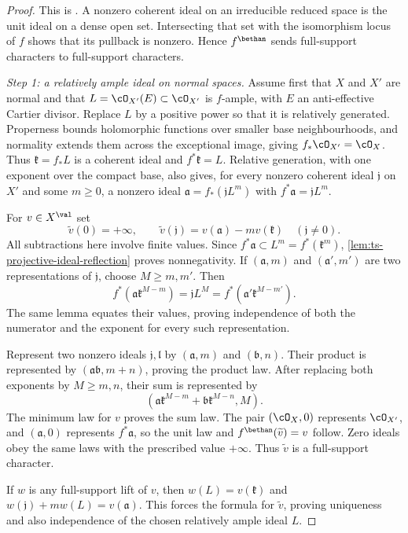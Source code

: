 \begin{proof}
This is \cite[Proposition~2.1.6]{MPTropicalV2}. A nonzero coherent ideal on an irreducible reduced space is the unit ideal on a
dense open set. Intersecting that set with the isomorphism locus of
$f$ shows that its pullback is nonzero. Hence $f^\bethan$ sends
full-support characters to full-support characters.

\emph{Step 1: a relatively ample ideal on normal spaces.}
Assume first that $X$ and $X'$ are normal and that
$L=\cO_{X'}(E)\subset\cO_{X'}$ is $f$-ample, with $E$ an
anti-effective Cartier divisor. Replace $L$ by a positive power so
that it is relatively generated. Properness bounds holomorphic
functions over smaller base neighbourhoods, and normality extends
them across the exceptional image, giving $f_*\cO_{X'}=\cO_X$. Thus
$\mathfrak k=f_*L$ is a coherent ideal and $f^*\mathfrak k=L$.
Relative generation, with one exponent over the compact base, also
gives, for every nonzero coherent ideal $\mathfrak j$ on $X'$ and some $m\geq0$, a nonzero ideal
$\mathfrak a=f_*(\mathfrak jL^m)$ with
$f^*\mathfrak a=\mathfrak jL^m$.

For $v\in X^{\val}$ set
\[
 \widetilde v(0)=+\infty,\qquad
 \widetilde v(\mathfrak j)=v(\mathfrak a)-m v(\mathfrak k)
       \quad(\mathfrak j\ne0).
\]
All subtractions here involve finite values. Since
$f^*\mathfrak a\subset L^m=f^*(\mathfrak k^m)$,
\cref{lem:ts-projective-ideal-reflection} proves nonnegativity.
If $(\mathfrak a,m)$ and $(\mathfrak a',m')$ are two representations
of $\mathfrak j$, choose $M\geq m,m'$. Then
\[
 f^*(\mathfrak a\mathfrak k^{M-m})
   =\mathfrak jL^M
   =f^*(\mathfrak a'\mathfrak k^{M-m'}).
\]
The same lemma equates their values, proving independence of both
the numerator and the exponent for every such representation.

Represent two nonzero ideals $\mathfrak j,\mathfrak l$ by
$(\mathfrak a,m)$ and $(\mathfrak b,n)$. Their product is represented
by $(\mathfrak a\mathfrak b,m+n)$, proving the product law. After
replacing both exponents by $M\geq m,n$, their sum is represented by
\[
 (\mathfrak a\mathfrak k^{M-m}
       +\mathfrak b\mathfrak k^{M-n},M).
\]
The minimum law for $v$ proves the sum law. The pair $(\cO_X,0)$
represents $\cO_{X'}$, and $(\mathfrak a,0)$ represents
$f^*\mathfrak a$, so the unit law and
$f^\bethan(\widetilde v)=v$ follow. Zero ideals obey the same laws
with the prescribed value $+\infty$. Thus $\widetilde v$ is a
full-support character.

If $w$ is any full-support lift of $v$, then
$w(L)=v(\mathfrak k)$ and
$w(\mathfrak j)+m w(L)=v(\mathfrak a)$. This forces the formula for
$\widetilde v$, proving uniqueness and also independence of the
chosen relatively ample ideal $L$.


\end{proof}
